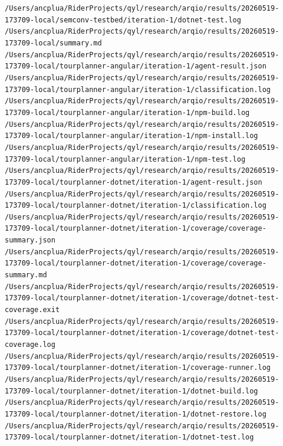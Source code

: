 \noindent \texttt{/Users/ancplua/RiderProjects/qyl/research/arqio/results/20260519-173709-local/semconv-testbed/iteration-1/dotnet-test.log}\\
\noindent \texttt{/Users/ancplua/RiderProjects/qyl/research/arqio/results/20260519-173709-local/summary.md}\\
\noindent \texttt{/Users/ancplua/RiderProjects/qyl/research/arqio/results/20260519-173709-local/tourplanner-angular/iteration-1/agent-result.json}\\
\noindent \texttt{/Users/ancplua/RiderProjects/qyl/research/arqio/results/20260519-173709-local/tourplanner-angular/iteration-1/classification.log}\\
\noindent \texttt{/Users/ancplua/RiderProjects/qyl/research/arqio/results/20260519-173709-local/tourplanner-angular/iteration-1/npm-build.log}\\
\noindent \texttt{/Users/ancplua/RiderProjects/qyl/research/arqio/results/20260519-173709-local/tourplanner-angular/iteration-1/npm-install.log}\\
\noindent \texttt{/Users/ancplua/RiderProjects/qyl/research/arqio/results/20260519-173709-local/tourplanner-angular/iteration-1/npm-test.log}\\
\noindent \texttt{/Users/ancplua/RiderProjects/qyl/research/arqio/results/20260519-173709-local/tourplanner-dotnet/iteration-1/agent-result.json}\\
\noindent \texttt{/Users/ancplua/RiderProjects/qyl/research/arqio/results/20260519-173709-local/tourplanner-dotnet/iteration-1/classification.log}\\
\noindent \texttt{/Users/ancplua/RiderProjects/qyl/research/arqio/results/20260519-173709-local/tourplanner-dotnet/iteration-1/coverage/coverage-summary.json}\\
\noindent \texttt{/Users/ancplua/RiderProjects/qyl/research/arqio/results/20260519-173709-local/tourplanner-dotnet/iteration-1/coverage/coverage-summary.md}\\
\noindent \texttt{/Users/ancplua/RiderProjects/qyl/research/arqio/results/20260519-173709-local/tourplanner-dotnet/iteration-1/coverage/dotnet-test-coverage.exit}\\
\noindent \texttt{/Users/ancplua/RiderProjects/qyl/research/arqio/results/20260519-173709-local/tourplanner-dotnet/iteration-1/coverage/dotnet-test-coverage.log}\\
\noindent \texttt{/Users/ancplua/RiderProjects/qyl/research/arqio/results/20260519-173709-local/tourplanner-dotnet/iteration-1/coverage-runner.log}\\
\noindent \texttt{/Users/ancplua/RiderProjects/qyl/research/arqio/results/20260519-173709-local/tourplanner-dotnet/iteration-1/dotnet-build.log}\\
\noindent \texttt{/Users/ancplua/RiderProjects/qyl/research/arqio/results/20260519-173709-local/tourplanner-dotnet/iteration-1/dotnet-restore.log}\\
\noindent \texttt{/Users/ancplua/RiderProjects/qyl/research/arqio/results/20260519-173709-local/tourplanner-dotnet/iteration-1/dotnet-test.log}\\
